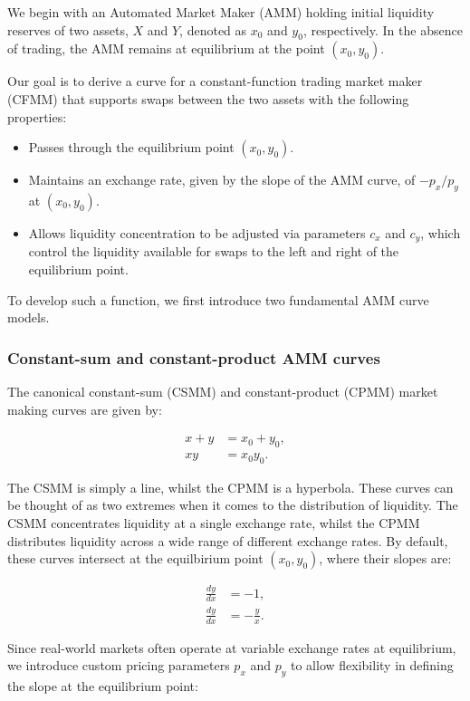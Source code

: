 \documentclass{article}
\begin{document}
We begin with an Automated Market Maker (AMM) holding initial liquidity reserves of two assets, $X$ and $Y$, denoted as $x_0$ and $y_0$, respectively. In the absence of trading, the AMM remains at equilibrium at the point $(x_0, y_0)$. 

Our goal is to derive a curve for a constant-function trading market maker (CFMM) that supports swaps between the two assets with the following properties:

\begin{itemize}
    \item Passes through the equilibrium point $(x_0, y_0)$.
    \item Maintains an exchange rate, given by the slope of the AMM curve, of $-p_x / p_y$ at $(x_0, y_0)$.
    \item Allows liquidity concentration to be adjusted via parameters $c_x$ and $c_y$, which control the liquidity available for swaps to the left and right of the equilibrium point.
\end{itemize}

To develop such a function, we first introduce two fundamental AMM curve models.

\subsubsection{Constant-sum and constant-product AMM curves}

The canonical constant-sum (CSMM) and constant-product (CPMM) market making curves are given by:

\begin{align}
    x + y &= x_0 + y_0, \\
    xy &= x_0 y_0.
\end{align}

The CSMM is simply a line, whilst the CPMM is a hyperbola. These curves can be thought of as two extremes when it comes to the distribution of liquidity. The CSMM concentrates liquidity at a single exchange rate, whilst the CPMM distributes liquidity across a wide range of different exchange rates. By default, these curves intersect at the equilbirium point $(x_0, y_0)$, where their slopes are:

\begin{align}
    \frac{dy}{dx} &= -1, \\
    \frac{dy}{dx} &= -\frac{y}{x}.
\end{align}

Since real-world markets often operate at variable exchange rates at equilibrium, we introduce custom pricing parameters $p_x$ and $p_y$ to allow flexibility in defining the slope at the equilibrium point:
\end{document}
